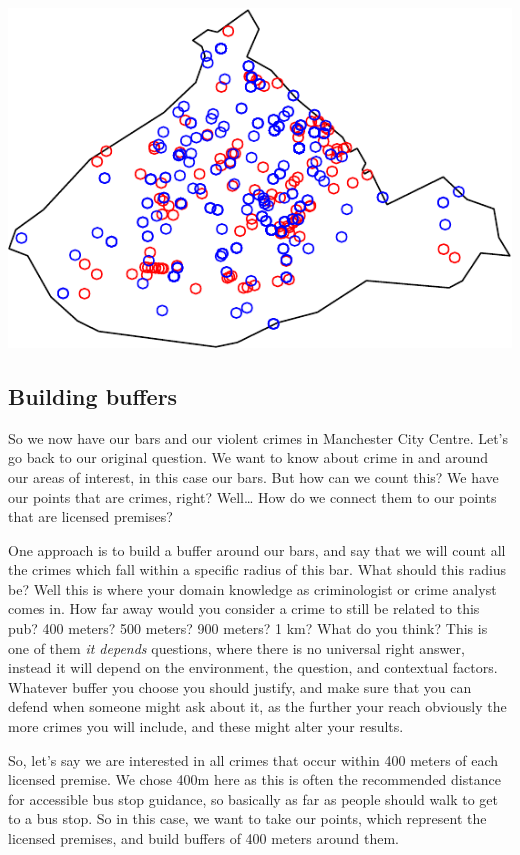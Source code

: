 \documentclass[
]{book}
\begin{document}
\includegraphics{crime_mapping_files/figure-latex/plot_bars_crimes-1.pdf}

\hypertarget{building-buffers}{%
\subsection{Building buffers}\label{building-buffers}}

So we now have our bars and our violent crimes in Manchester City Centre. Let's go back to our original question. We want to know about crime in and around our areas of interest, in this case our bars. But how can we count this? We have our points that are crimes, right? Well\ldots{} How do we connect them to our points that are licensed premises?

One approach is to build a buffer around our bars, and say that we will count all the crimes which fall within a specific radius of this bar. What should this radius be? Well this is where your domain knowledge as criminologist or crime analyst comes in. How far away would you consider a crime to still be related to this pub? 400 meters? 500 meters? 900 meters? 1 km? What do you think? This is one of them \emph{it depends} questions, where there is no universal right answer, instead it will depend on the environment, the question, and contextual factors. Whatever buffer you choose you should justify, and make sure that you can defend when someone might ask about it, as the further your reach obviously the more crimes you will include, and these might alter your results.

So, let's say we are interested in all crimes that occur within 400 meters of each licensed premise. We chose 400m here as this is often the recommended distance for accessible bus stop guidance, so basically as far as people should walk to get to a bus stop. So in this case, we want to take our points, which represent the licensed premises, and build buffers of 400 meters around them.
\end{document}
